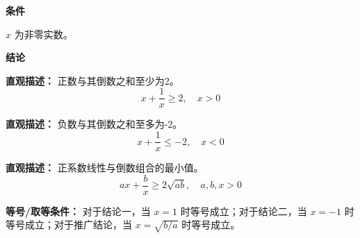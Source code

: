 \begin{statementbox}
\textbf{\textcolor{CStatement}{条件}}
\begin{description}[style=nextline, leftmargin=2.8em, labelsep=0.5em, itemsep=0.35em]
    \item[\textbf{\textcolor{CStatement}{条件 1（变量范围）：}}] $x$ 为非零实数。
\end{description}

\textbf{\textcolor{CStatement}{结论}}
\begin{description}[style=nextline, leftmargin=2.8em, labelsep=0.5em, itemsep=0.45em]
    \item[\textbf{\textcolor{CStatement}{结论一（正数情形）：}}]
    \textbf{\textcolor{CStatement}{直观描述：}} 正数与其倒数之和至少为2。
    \[
    x + \frac{1}{x} \geq 2, \quad x > 0
    \]

    \item[\textbf{\textcolor{CStatement}{结论二（负数情形）：}}]
    \textbf{\textcolor{CStatement}{直观描述：}} 负数与其倒数之和至多为-2。
    \[
    x + \frac{1}{x} \leq -2, \quad x < 0
    \]

    \item[\textbf{\textcolor{CStatement}{推广结论（一般形式）：}}]
    \textbf{\textcolor{CStatement}{直观描述：}} 正系数线性与倒数组合的最小值。
    \[
    a x + \frac{b}{x} \geq 2\sqrt{ab}, \quad a, b, x > 0
    \]
\end{description}

\textbf{\textcolor{CStatement}{等号/取等条件：}} 对于结论一，当 $x=1$ 时等号成立；对于结论二，当 $x=-1$ 时等号成立；对于推广结论，当 $x=\sqrt{b/a}$ 时等号成立。
\end{statementbox}
